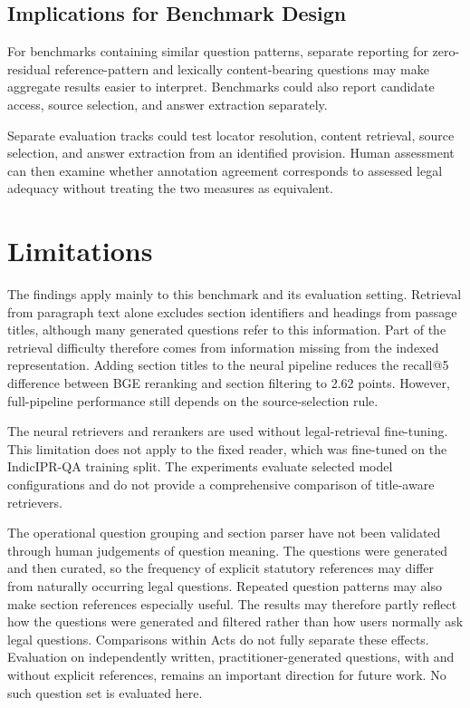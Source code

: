 \documentclass[pdflatex,sn-basic]{sn-jnl}%
\theoremstyle{thmstyleone}%
\theoremstyle{thmstyletwo}%
\theoremstyle{thmstylethree}%
\begin{document}
\subsection{Implications for Benchmark Design}

For benchmarks containing similar question patterns, separate reporting for
zero-residual reference-pattern and lexically content-bearing questions may
make aggregate results easier to interpret. Benchmarks could also report
candidate access, source selection, and answer extraction separately.

Separate evaluation tracks could test locator resolution, content retrieval,
source selection, and answer extraction from an identified provision. Human
assessment can then examine whether annotation agreement corresponds to
assessed legal adequacy without treating the two measures as equivalent.

\section{Limitations}
\label{sec:limitations}

The findings apply mainly to this benchmark and its evaluation setting.
Retrieval from paragraph text alone excludes section identifiers and headings
from passage titles, although many generated questions refer to this
information. Part of the retrieval difficulty therefore comes from
information missing from the indexed representation. Adding section titles
to the neural pipeline reduces the recall@5 difference between BGE reranking
and section filtering to 2.62 points. However, full-pipeline performance still
depends on the source-selection rule.

The neural retrievers and rerankers are used without legal-retrieval
fine-tuning. This limitation does not apply to the fixed reader, which was
fine-tuned on the IndicIPR-QA training split. The experiments evaluate selected
model configurations and do not provide a comprehensive comparison of
title-aware retrievers.

The operational question grouping and section parser have not been validated
through human judgements of question meaning. The questions were generated
and then curated, so the frequency of explicit statutory references may
differ from naturally occurring legal questions. Repeated question patterns
may also make section references especially useful. The results may therefore
partly reflect how the questions were generated and filtered rather than how
users normally ask legal questions. Comparisons within Acts do not fully
separate these effects. Evaluation on independently written,
practitioner-generated questions, with and without explicit references,
remains an important direction for future work. No such question set is
evaluated here.
\end{document}

